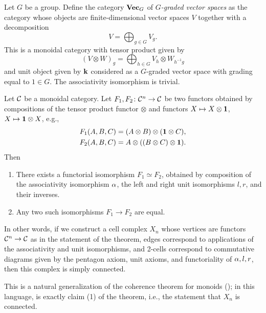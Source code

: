 \begin{example}\label{x:vecg}
  Let $G$ be a group. Define the category $\mathbf{Vec}_G$ of \emph{$G$-graded vector
  spaces} as the category
  whose objects are finite-dimensional vector spaces $V$ together with
  a decomposition
  $$
    V=\bigoplus_{g\in G} V_g.
  $$
  This is a monoidal category with tensor product given by
  $$
    (V\otimes W)_g = \bigoplus_{h\in G} V_h \otimes W_{h^{-1}g}
  $$
  and unit object given by $\mathbf{k}$ considered as a $G$-graded vector space with
  grading equal to $1\in G$. The associativity isomorphism is trivial.
\end{example}



\begin{theorem}\label{t:maclane}\par

  \noindent Let $\mathcal{C}$ be a monoidal category. Let
  $F_1, F_2\colon \mathcal{C}^n\to \mathcal{C}$ be two functors obtained by compositions of
  the tensor product functor $\otimes$ and functors $X\mapsto X\otimes \mathbf{1}$,
  $X\mapsto \mathbf{1} \otimes X$, e.g.,
  \begin{align*}
    F_1(A,B,C)&=(A\otimes B)\otimes (\mathbf{1}\otimes C),\\
    F_2(A,B,C)&=A\otimes (( B\otimes  C)\otimes \mathbf{1}).
  \end{align*}
  Then
  \begin{enumerate}
    \item There exists a functorial isomorphism $F_1\simeq F_2$, obtained
      by composition of the associativity isomorphism $\alpha$, the left and right
      unit isomorphisms $l,r$, and their inverses.
    \item Any two such isomorphisms $F_1\to F_2$ are equal.
  \end{enumerate}
\end{theorem}
In other words, if we construct a cell complex $X_n$ whose vertices are functors
$\mathcal{C}^n\to \mathcal{C}$ as in the statement of the theorem, edges correspond to
applications of the associativity and unit isomorphisms, and 2-cells correspond
to commutative diagrams given by the pentagon axiom, unit axioms, and
functoriality of $\alpha, l, r$, then this complex is simply connected.

This is a natural generalization of the coherence theorem for monoids
(); in this language, 
is exactly claim (1) of the theorem, i.e., the statement that $X_n$
is connected.


